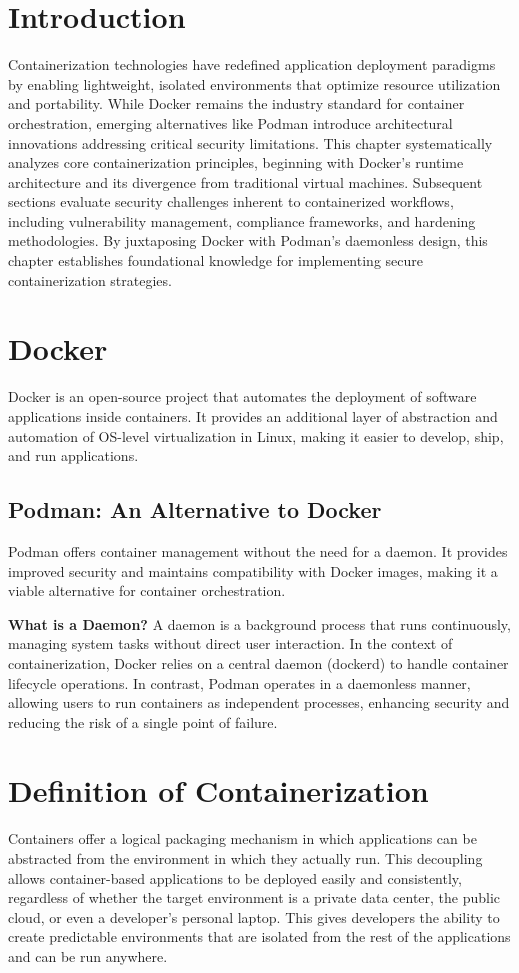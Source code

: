 \documentclass[12pt,a4paper]{report}
\begin{document}
\section{Introduction}
Containerization technologies have redefined application deployment paradigms by enabling lightweight, isolated environments that optimize resource utilization and portability. While Docker remains the industry standard for container orchestration, emerging alternatives like Podman introduce architectural innovations addressing critical security limitations. This chapter systematically analyzes core containerization principles, beginning with Docker’s runtime architecture and its divergence from traditional virtual machines. Subsequent sections evaluate security challenges inherent to containerized workflows, including vulnerability management, compliance frameworks, and hardening methodologies. By juxtaposing Docker with Podman’s daemonless design, this chapter establishes foundational knowledge for implementing secure containerization strategies.

\section{ Docker}
Docker is an open-source project that automates the deployment of software applications inside containers. It provides an additional layer of abstraction and automation of OS-level virtualization in Linux, making it easier to develop, ship, and run applications.

\subsection{Podman: An Alternative to Docker}
Podman offers container management without the need for a daemon. It provides improved security and maintains compatibility with Docker images, making it a viable alternative for container orchestration.

\textbf{What is a Daemon?}
A daemon is a background process that runs continuously, managing system tasks without direct user interaction. In the context of containerization, Docker relies on a central daemon (dockerd) to handle container lifecycle operations. In contrast, Podman operates in a daemonless manner, allowing users to run containers as independent processes, enhancing security and reducing the risk of a single point of failure.
\newpage
\section{Definition  of Containerization}
Containers offer a logical packaging mechanism in which applications can be abstracted from the environment in which they actually run. This decoupling allows container-based applications to be deployed easily and consistently, regardless of whether the target environment is a private data center, the public cloud, or even a developer’s personal laptop. This gives developers the ability to create predictable environments that are isolated from the rest of the applications and can be run anywhere.
\end{document}
